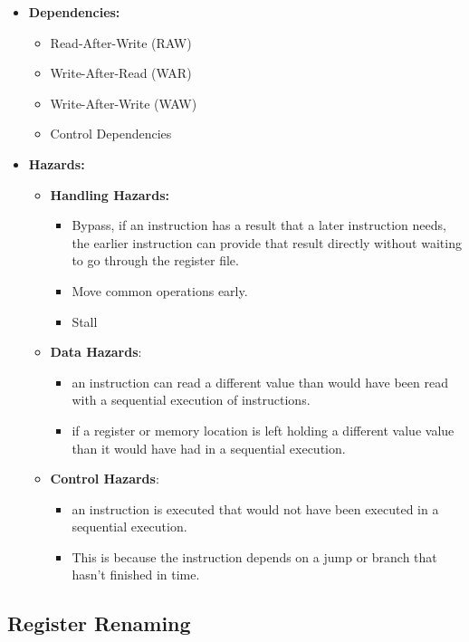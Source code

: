 \documentclass[../main.tex]{subfiles}
\begin{document}
\begin{itemize}
	\item \textbf{Dependencies:}
	      \begin{itemize}
		      \item Read-After-Write (RAW)
		      \item Write-After-Read (WAR)
		      \item Write-After-Write (WAW)
		      \item Control Dependencies
	      \end{itemize}
	\item \textbf{Hazards:}
	      \begin{itemize}
		      \item \textbf{Handling Hazards:}
		            \begin{itemize}
			            \item Bypass, if an instruction has a result that a later instruction needs, the earlier instruction can provide that result directly without waiting to go through the register file.
			            \item Move common operations early.
			            \item Stall
		            \end{itemize}
		      \item \textbf{Data Hazards}:
		            \begin{itemize}
			            \item an instruction can read a different value than would have been read with a sequential execution of instructions.
			            \item if a register or memory location is left holding a different value value than it would have had in a sequential execution.
		            \end{itemize}
		      \item \textbf{Control Hazards}:
		            \begin{itemize}
			            \item an instruction is executed that would not have been executed in a sequential execution.
			            \item This is because the instruction depends on a jump or branch that hasn't finished in time.
		            \end{itemize}
	      \end{itemize}
\end{itemize}

\subsection{Register Renaming}
\end{document}
